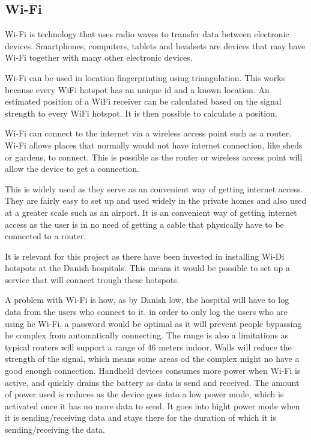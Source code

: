 \subsection{Wi-Fi} \label{wifitech}
Wi-Fi is  technology that uses radio waves to transfer data between electronic devices. Smartphones, computers, tablets and headsets are devices that may have Wi-Fi together with many other electronic devices\cite{wifi_devices}.

Wi-Fi can be used in location fingerprinting using triangulation. This works because every WiFi hotspot has an unique id and a known location. An estimated position of a WiFi receiver can be calculated based on the signal strength to every WiFi hotspot. It is then possible to calculate a position.\cite{Liu2007}

Wi-Fi can connect to the internet via a wireless access point such as a router. Wi-Fi allows places that normally would not have internet connection, like sheds or gardens, to connect. This is possible as the router or wireless access point will allow the device to get a connection.

This is widely used as they serve as an convenient way of getting internet access. They are fairly easy to set up and used widely in the private homes and also used at a greater scale such as an airport\cite{wifi_works}. It is an convenient way of getting internet access as the user is in no need of getting a cable that physically have to be connected to a router.

It is relevant for this project as there have been invested in installing Wi-Di hotspots at the Danish hospitals\cite{wifi_hospi}. This means it would be possible to set up a service that will connect trough these hotspots.

A problem with Wi-Fi is how, as by Danish low, the hospital will have to log data from the users who connect to it\cite{wifi_log}. in order to only log the users who are using he Wi-Fi, a password would be optimal as it will prevent people bypassing he complex from automatically connecting. The range is also a limitations as typical routers will support a range of 46 meters indoor\cite{wifi_range}. Walls will reduce the strength of the signal, which means some areas od the complex might no have a good enough connection\cite{wifi_wall}. Handheld devices consumes more power when Wi-Fi is active, and quickly drains the battery as data is send and received\cite{wifi_batt}. The amount of power used is reduces as the device goes into a low power mode, which is activated once it has no more data to send. It goes into hight power mode when it is sending/receiving data and stays there for the duration of which it is sending/receiving the data.
